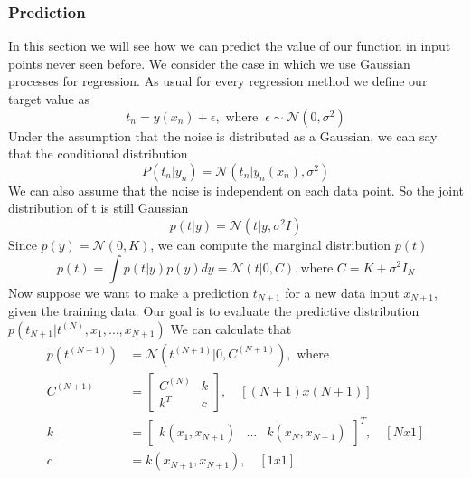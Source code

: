 \documentclass[main.tex]{subfiles}
\begin{document}
\subsubsection{Prediction}
In this section we will see how we can predict the value of our function in input points never seen before. We consider the case in which we use Gaussian processes for regression. As usual for every regression method we define our target value as
\begin{equation*}
    t_n = y(x_n) + \epsilon,\text{ where } \ \epsilon \sim \mathcal{N}(0, \sigma^2)
\end{equation*}
Under the assumption that the noise is distributed as a Gaussian, we can say that the conditional distribution
\begin{equation}
    P(t_n|y_n) = \mathcal{N}(t_n|y_n(x_n), \sigma^2)
\end{equation}
We can also assume that the noise is independent on each data point. So the joint distribution of t is still Gaussian
\begin{equation}
    p(t|y) = \mathcal{N}(t|y, \sigma^2 I)
\end{equation}
Since $p(y)=\mathcal{N}(0, K)$, we can compute the marginal distribution $p(t)$
\begin{equation}
    p(t) = \int p(t|y)p(y)dy = \mathcal{N}(t|0,C),\text{where } C = K + \sigma^2 I_N
\end{equation}
Now suppose we want to make a prediction $t_{N+1}$ for a new data input $x_{N+1}$, given the training data. Our goal is to evaluate the predictive distribution $p(t_{N+1}|t^{(N)},x_1,\dots,x_{N+1})$\footnotemark {}
We can calculate that
\begin{align*}
    p(t^{(N+1)}) & = \mathcal{N}(t^{(N+1)}|0,C^{(N+1)}), \text{ where}                                      \\
    C^{(N+1)}    & =
    \begin{bmatrix}
        C^{(N)} & k \\
        k^T     & c
    \end{bmatrix}, \quad [(N+1) x (N+1)]                                                                    \\
    k            & = \begin{bmatrix} k(x_1, x_{N+1}) & \dots & k(x_N, x_{N+1}) \end{bmatrix}^T, \quad [Nx1] \\
    c            & = k(x_{N+1},x_{N+1}), \quad [1x1]
\end{align*}
\end{document}
